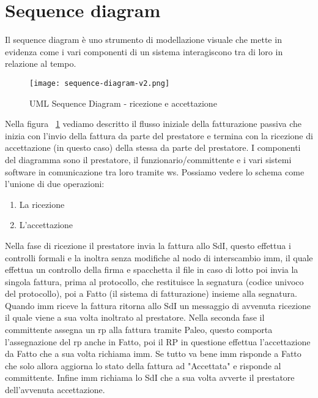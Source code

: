 
\newpage

\section{Sequence diagram}

Il sequence diagram è uno strumento di modellazione visuale che mette in evidenza come i vari componenti di un sistema interagiscono tra di loro in relazione al tempo.

\begin{figure}[H]
    \centering
    \texttt{[image: sequence-diagram-v2.png]}
    \caption{UML Sequence Diagram - ricezione e accettazione}
    \label{fig:SequenceDiagram}
\end{figure}

Nella figura ~\ref{fig:SequenceDiagram} vediamo descritto il flusso iniziale della fatturazione passiva che inizia con l'invio della fattura da parte del prestatore e termina con la ricezione di accettazione (in questo caso) della stessa da parte del prestatore.
I componenti del diagramma sono il prestatore, il funzionario/committente e i vari sistemi software in comunicazione tra loro tramite \Gls{ws}.
Possiamo vedere lo schema come l'unione di due operazioni:
\begin{enumerate}
\item La ricezione
\item L'accettazione
\end{enumerate}
Nella fase di ricezione il prestatore invia la fattura allo SdI, questo effettua i controlli formali e la inoltra senza modifiche al nodo di interscambio \Gls{imm}, il quale effettua un controllo della firma e spacchetta il file in caso di lotto poi invia la singola fattura, prima al  protocollo, che restituisce la segnatura (codice univoco del protocollo), poi a Fatto (il sistema di fatturazione) insieme alla segnatura.
Quando \Gls{imm} riceve la fattura ritorna allo SdI un messaggio di avvenuta ricezione il quale viene a sua volta inoltrato al prestatore.
Nella seconda fase il committente assegna un \Gls{rp} alla fattura tramite Paleo, questo comporta l'assegnazione del \Gls{rp} anche in Fatto, poi il RP in questione effettua l'accettazione da Fatto che a sua volta richiama \Gls{imm}.
Se tutto va bene \Gls{imm} risponde a Fatto che solo allora aggiorna lo stato della fattura ad "Accettata" e risponde al committente.
Infine \Gls{imm} richiama lo SdI che a sua volta avverte il prestatore dell'avvenuta accettazione.

